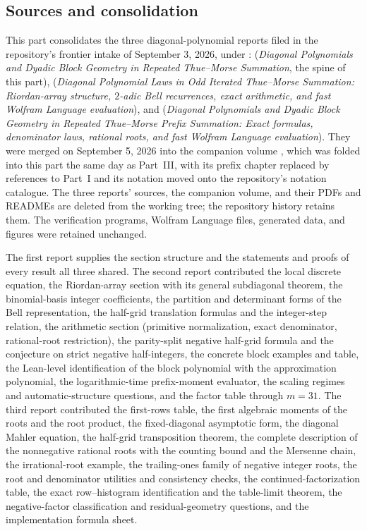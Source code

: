 \documentclass[11pt,oneside]{article}
\numberwithin{equation}{section}
\theoremstyle{definition}
\theoremstyle{remark}
\begin{document}
\subsection{Sources and consolidation}
This part consolidates the three diagonal-polynomial reports filed in the
repository's frontier intake of September 3, 2026, under
: 
(\emph{Diagonal Polynomials and Dyadic Block Geometry in Repeated
Thue--Morse Summation}, the spine of this part),
 (\emph{Diagonal Polynomial Laws in
Odd Iterated Thue--Morse Summation: Riordan-array structure, $2$-adic Bell
recurrences, exact arithmetic, and fast Wolfram Language evaluation}), and
 (\emph{Diagonal
Polynomials and Dyadic Block Geometry in Repeated Thue--Morse Prefix
Summation: Exact formulas, denominator laws, rational roots, and fast
Wolfram Language evaluation}).  They were merged on September 5, 2026 into
the companion volume , which was folded
into this part the same day as Part~III, with its prefix chapter replaced
by references to Part~I and its notation moved onto the repository's
notation catalogue.  The three reports' sources, the companion volume, and
their PDFs and READMEs are deleted from the working tree; the repository
history retains them.  The verification programs, Wolfram Language files,
generated data, and figures were retained unchanged.

The first report supplies the section structure and the statements and
proofs of every result all three shared.  The second report contributed the
local discrete equation, the Riordan-array section with its general
subdiagonal theorem, the binomial-basis integer coefficients, the partition
and determinant forms of the Bell representation, the half-grid
translation formulas and the integer-step relation, the arithmetic section
(primitive normalization, exact denominator, rational-root restriction),
the parity-split negative half-grid formula and the conjecture on strict
negative half-integers, the concrete block examples and table, the
Lean-level identification of the block polynomial with the approximation
polynomial, the logarithmic-time prefix-moment evaluator, the scaling
regimes and automatic-structure questions, and the factor table through
$m=31$.  The third report contributed the first-rows table, the first
algebraic moments of the roots and the root product, the fixed-diagonal
asymptotic form, the diagonal Mahler equation, the half-grid transposition
theorem, the complete description of the nonnegative rational roots with
the counting bound and the Mersenne chain, the irrational-root example, the
trailing-ones family of negative integer roots, the root and denominator
utilities and consistency checks, the continued-factorization table, the
exact row--histogram identification and the table-limit theorem, the
negative-factor classification and residual-geometry questions, and the
implementation formula sheet.
\end{document}
